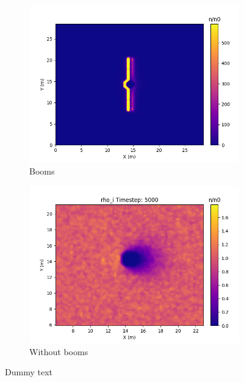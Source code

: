 \begin{center}
    \begin{figure}[H]
      \begin{subfigure}[b]{0.61\textwidth}
      \includegraphics[width=\textwidth]{figures/MMO/plusX/Booms/BoomPlusXrhoET5000XYRestr05.png}
      \caption{Booms}
      \label{fig:PhiXBoomsPlusX}
    \end{subfigure}
    \begin{subfigure}[b]{0.61\textwidth}
      \includegraphics[width=\textwidth]{figures/MMO/plusX/noBooms/noBoomsPlusXrhoIT5000.png}
      \caption{Without booms}
      \label{fig:PhiXnoBoomsPlusX}
    \end{subfigure}
  \label{fig:PhiXDriftX}
  \caption{Dummy text}
  \end{figure}
\end{center}

